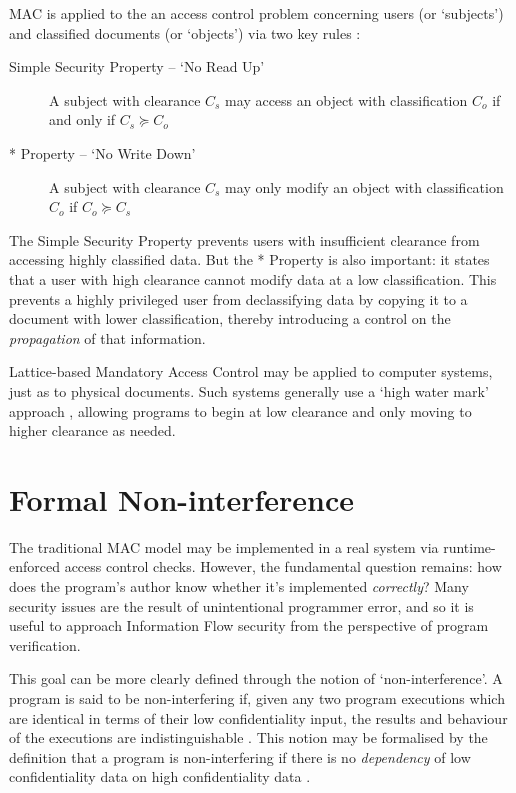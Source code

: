 MAC is applied to the an access control problem concerning users (or `subjects') and classified documents (or `objects') via two key rules \cite{sandhu1993lattice}:

\begin{description}
	\item[Simple Security Property -- `No Read Up'] A subject with clearance $ C_s $ may access an object with classification $ C_o $ if and only if $ C_s \succeq C_o $
	
	\item[* Property -- `No Write Down'] A subject with clearance $ C_s $ may only modify an object with classification $ C_o $ if $ C_o \succeq C_s $
\end{description}

The Simple Security Property prevents users with insufficient clearance from accessing highly classified data. But the * Property is also important: it states that a user with high clearance cannot modify data at a low classification. This prevents a highly privileged user from declassifying data by copying it to a document with lower classification, thereby introducing a control on the \textit{propagation} of that information.

Lattice-based Mandatory Access Control may be applied to computer systems, just as to physical documents. Such systems generally use a `high water mark' approach \cite{jones1975highwatermark}, allowing programs to begin at low clearance and only moving to higher clearance as needed.

\section{Formal Non-interference} \label{theory_if_noninterference}

The traditional MAC model may be implemented in a real system via runtime-enforced access control checks. However, the fundamental question remains: how does the program's author know whether it's implemented \textit{correctly}? Many security issues are the result of unintentional programmer error, and so it is useful to approach Information Flow security from the perspective of program verification.

This goal can be more clearly defined through the notion of `non-interference'. A program is said to be non-interfering if, given any two program executions which are identical in terms of their low confidentiality input, the results and behaviour of the executions are indistinguishable \cite{sabelfeld2003if}. This notion may be formalised by the definition that a program is non-interfering if there is no \textit{dependency} of low confidentiality data on high confidentiality data \cite{cohen1977declassification}.

